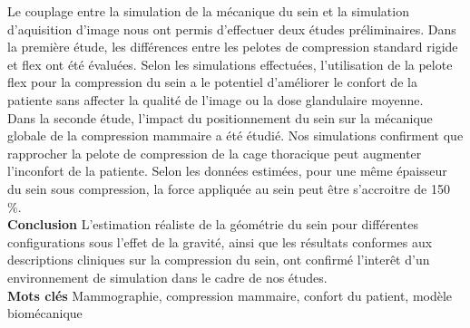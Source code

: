 \noindent
Le couplage entre la simulation de la mécanique du sein et la simulation d'aquisition d'image nous ont permis d'effectuer deux études préliminaires. Dans la première étude, les différences entre les pelotes de compression standard rigide et flex ont été évaluées. Selon les simulations effectuées, l'utilisation de la pelote flex pour la compression du sein a le potentiel d'améliorer le confort de la patiente sans affecter la qualité de l'image ou la dose glandulaire moyenne.\\

\noindent
Dans la seconde étude, l'impact du positionnement du sein sur la mécanique globale de la compression mammaire a été étudié. Nos simulations confirment que rapprocher la pelote de compression de la cage thoracique peut augmenter l'inconfort de la patiente. Selon les données estimées, pour une même épaisseur du sein sous compression, la force appliquée au sein peut être s'accroitre de 150 $ \% $. \\

\noindent
\textbf{Conclusion} L'estimation réaliste de la géométrie du sein pour différentes configurations sous l'effet de la gravité, ainsi que les résultats conformes aux descriptions cliniques sur la compression du sein, ont confirmé l'interêt d'un environnement de simulation dans le cadre de nos études. \\

\noindent
\textbf{Mots clés} Mammographie, compression mammaire, confort du patient, modèle biomécanique
